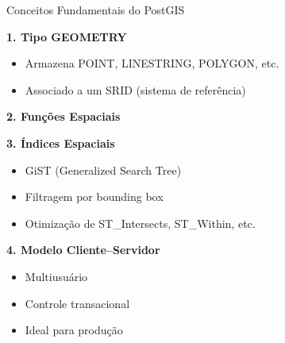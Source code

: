 \documentclass{beamer}
\begin{document}
\begin{frame}{Conceitos Fundamentais do PostGIS}
    
    \textbf{1. Tipo GEOMETRY}
    \begin{itemize}
        \item Armazena POINT, LINESTRING, POLYGON, etc.
        \item Associado a um SRID (sistema de referência)
    \end{itemize}
    
    \vspace{0.3cm}
    
    \textbf{2. Funções Espaciais}
    
    \vspace{0.3cm}
    
    \textbf{3. Índices Espaciais}
    \begin{itemize}
        \item GiST (Generalized Search Tree)
        \item Filtragem por bounding box
        \item Otimização de ST\_Intersects, ST\_Within, etc.
    \end{itemize}
    
    \vspace{0.3cm}
    
    \textbf{4. Modelo Cliente–Servidor}
    \begin{itemize}
        \item Multiusuário
        \item Controle transacional
        \item Ideal para produção
    \end{itemize}
    
\end{frame}
\end{document}
